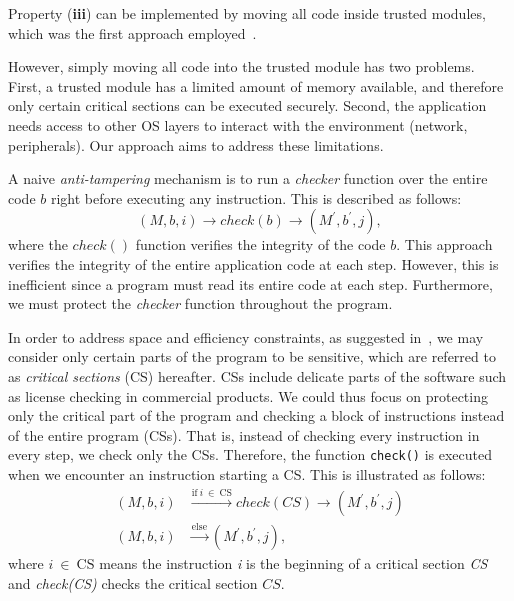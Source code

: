 Property (\textbf{iii}) can be implemented by moving all code inside trusted 
modules, which was the first approach 
employed~\citep{baumann2015shielding,arnautov2016scone,tsai2017graphene}.

However, simply moving all code into the trusted module has two problems.
First, a trusted module has a limited amount of memory available, and therefore 
only
certain critical sections can be executed securely.
Second, the application needs access to other OS layers to interact with the 
environment (network, peripherals).
Our approach aims to address these limitations.

A naive \emph{anti-tampering} mechanism is to run a \emph{checker} function 
over the entire code $b$ right before executing any instruction. This is 
described as follows:
\[ (M,b,i) \rightarrow check(b) \rightarrow (M^\prime,b^\prime,j), \]
where the $check()$ function verifies the integrity of the code $b$.
This approach verifies the integrity of the entire application code at each 
step. However, this is inefficient since a program must read its entire code at 
each step. Furthermore, we must protect the \emph{checker} function throughout 
the program.

In order to address space and efficiency constraints, as suggested 
in~\citep{brumley2004privtrans,singaravelu2006reducing,smith2006refactoring}, 
we may consider only certain parts of the program to be sensitive, which are 
referred to as \emph{critical sections} (CS) hereafter.
CSs include delicate parts of the software such as license checking in 
commercial products. We could thus focus on protecting only the critical part 
of the program and checking a block of instructions instead of the entire 
program (\ie CSs).
That is, instead of checking every instruction in every step, we check only the 
CSs.
Therefore, the function \texttt{check()} is executed when we encounter an 
instruction starting a CS.
This is illustrated as follows:
\begin{align}
	(M,b,i) & \xrightarrow{\text{if}~i~\in~\text{CS}} check(CS) \rightarrow 
	(M^\prime,b^\prime,j) \nonumber \\
	(M,b,i) & \xrightarrow{\text{else}} (M^\prime,b^\prime,j), \nonumber
\end{align}
where $i~\in~\text{CS}$ means the instruction \emph{i} is the beginning of a 
critical section \emph{CS} and \emph{check(CS)} checks the critical section 
$CS$.

